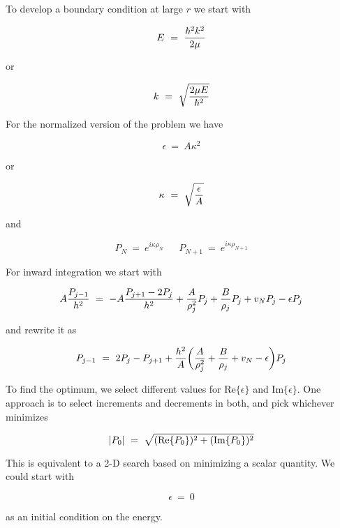 To develop a boundary condition at large $r$ we start with

\begin{equation}
E ~=~ {\hbar^2 k^2 \over 2 \mu}
\end{equation}

\noindent
or

\begin{equation}
k ~=~ \sqrt{2 \mu E \over \hbar^2}
\end{equation}

\noindent
For the normalized version of the problem we have

\begin{equation}
\epsilon ~=~ A \kappa^2
\end{equation}

\noindent
or

\begin{equation}
\kappa ~=~ \sqrt{\epsilon \over A}
\end{equation}

\noindent
and

\begin{equation}
P_{N  } ~=~ e^{i \kappa \rho_{N  }}
\ \ \ \ \ \ \
P_{N+1} ~=~ e^{i \kappa \rho_{N+1}}
\end{equation}

For inward integration we start with

\begin{equation}
A {P_{j-1} \over h^2}
~=~
- A {P_{j+1} - 2 P_j  \over h^2}
+
{A \over \rho_j^2} P_j
+ 
{B \over \rho_j} P_j 
+ 
v_N P_j
-
\epsilon P_j
\end{equation}

\noindent
and rewrite it as

\begin{equation}
P_{j-1} 
~=~
2 P_j - P_{j+1}
+
{h^2 \over A}
\bigg (
{A \over \rho_j^2} 
+ 
{B \over \rho_j}  
+ 
v_N
-
\epsilon 
\bigg )
P_j
\end{equation}


To find the optimum, we select different values for Re$\lbrace \epsilon \rbrace$ and
Im$\lbrace \epsilon \rbrace$.  One approach is to select increments and decrements in both, and pick whichever minimizes

\begin{equation}
|P_0| ~=~ \sqrt{ ({\rm Re} \lbrace P_0 \rbrace)^2 + ({\rm Im} \lbrace P_0 \rbrace)^2}
\end{equation}

\noindent
This is equivalent to a 2-D search based on minimizing a scalar quantity.  We could start with

\begin{equation}
\epsilon ~=~ 0
\end{equation}
  
\noindent
as an initial condition on the energy.
